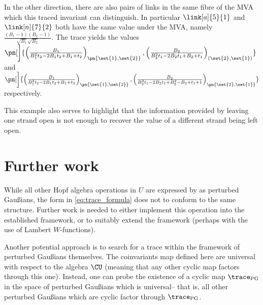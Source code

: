 In the other direction, there are also pairs of links in the same fibre of the
\ac{MVA} which this traced invariant can distinguish. In particular
$\link[a]{5}{1}$ and $\link[n]{7}{2}$ both have the same value under the
\ac{MVA}, namely
$\frac{\left(B_1-1\right) \left(B_2-1\right)}{\sqrt{B_1} \sqrt{B_2}}$.
The trace yields the values
$ \pn[\bigg]{
        \left(
                \frac{B_1}{B_1^2 t_2  -2 B_1 t_2  +B_1+t_2}
        \right)_{\pn{\set{1},\set{2}}},
        \left(
                \frac{B_2}{B_2^2 t_1  -2 B_2 t_1  +B_2+t_1}
        \right)_{(\set{2},\set{1})}
        }$
and
$\pn[\bigg]{
        \left(
                \frac{B_1}{B_1^2 t_2  -2 B_1 t_2  +B_1+t_2}
        \right)_{\pn{\set{1},\set{2}}},
        \left(
                \frac{B_2}{B_2^2 t_1  -2 B_2 t_1  +B_2^2-B_2+t_1 +1}
        \right)_{\pn{\set{2},\set{1}}}
}$
respectively.

This example also serves to highlight that the information provided by leaving
one strand open is not enough to recover the value of a different strand being
left open.

\section{Further work}
While all other Hopf algebra operations in $U$ are expressed by \cite{BV} as
perturbed Gaußians, the form in \cref{eq:trace_formula} does not to conform to
the same structure. Further work is needed to either implement this operation
into the established framework, or to suitably extend the framework (perhaps
with the use of Lambert $W$-functions).

Another potential approach is to search for a trace within the framework of
perturbed Gaußians themselves. The coinvariants map defined here are universal
with respect to the algebra $\CU$ (meaning that any other cyclic map factors
through this one). Instead, one can probe the existence of a cyclic map
$\trace_{\text{PG}}$ in the space of perturbed Gaußians which is universal--
that is, all other perturbed Gaußians which are cyclic factor through
$\trace_{\text{PG}}$.
